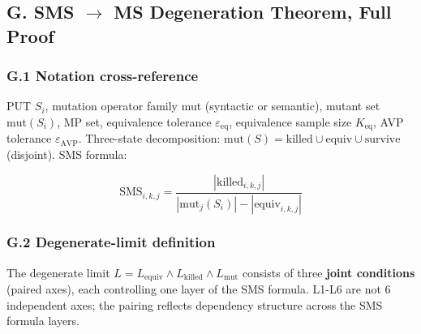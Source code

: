 \documentclass[review,12pt,authoryear]{elsarticle}
\begin{document}

\subsection{G. SMS $\to$ MS Degeneration Theorem, Full Proof}\label{g.-sms-ms-degeneration-theorem-full-proof}

\subsubsection{G.1 Notation cross-reference}\label{g.1-notation-cross-reference-with-2.1}

PUT $S_i$, mutation operator family mut (syntactic or semantic),
mutant set $\mathrm{mut}(S_i)$, MP set, equivalence tolerance $\varepsilon_{\mathrm{eq}}$, equivalence
sample size $K_{\mathrm{eq}}$, AVP tolerance $\varepsilon_{\mathrm{AVP}}$. Three-state decomposition:
$\mathrm{mut}(S)=\mathrm{killed} \cup \mathrm{equiv} \cup \mathrm{survive}$ (disjoint). SMS
formula:

\[
\mathrm{SMS}_{i,k,j} = \frac{|\mathrm{killed}_{i,k,j}|}{|\mathrm{mut}_j(S_i)| - |\mathrm{equiv}_{i,k,j}|}
\]

\subsubsection{G.2 Degenerate-limit definition}\label{g.2-degenerate-limit-definition-r-8-p1-3-revision-3-joint-conditions}

The degenerate limit $L = L_{\mathrm{equiv}} \wedge L_{\mathrm{killed}} \wedge L_{\mathrm{mut}}$
consists of three \textbf{joint conditions} (paired axes), each
controlling one layer of the SMS formula. L1-L6 are not 6 independent
axes; the pairing reflects dependency structure across the SMS formula
layers.
\end{document}
